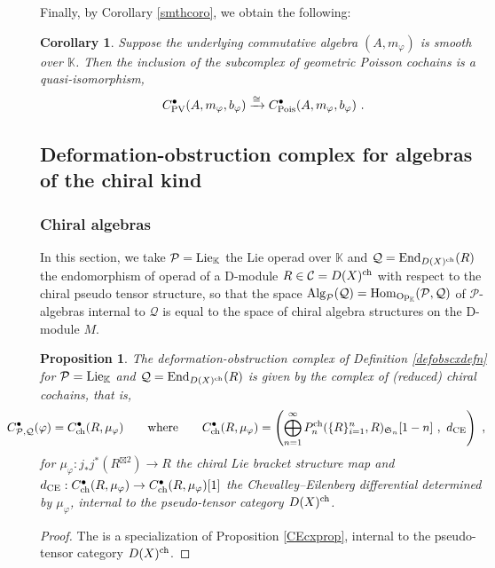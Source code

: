 \documentclass[11pt]{amsart}
\numberwithin{equation}{section}
\newtheorem{prop}[theo]{Proposition}
\newtheorem{coro}[theo]{Corollary}
\theoremstyle{definition}
\newcommand{\bb}{\mathbb}
\newcommand{\mc}{\mathcal}
\newcommand{\mf}{\mathfrak}
\DeclareMathOperator{\Hom}{Hom}
\newcommand{\K}{{\bb K}}
\newcommand{\End}{{\textup{End}}}
\newcommand{\Alg}{{\textup{Alg}}}
\newcommand{\Pois}{{\textup{Pois}}}
\newcommand{\Lie}{{\textup{Lie}}}
\newcommand{\ch}{{\textup{ch}}}
\newcommand{\Op}{{\textup{Op}}}
\newcommand{\Ss}{{{\mf{S}}}}
\newcommand{\PV}{{{\textup{PV}}}}
\newcommand{\0}{{\textbf{0}}}
\newcommand{\DD}{{D}}
\def\ch{{\rm ch}}
\def \mf{\mathfrak}
\def \Op{\mathrm{Op}}
\begin{document}
Finally, by Corollary \ref{smthcoro}, we obtain the following:

\begin{coro}\label{GOequivcoro} Suppose the underlying commutative algebra $(A,m_\varphi)$ is smooth over $\K$. Then the inclusion of the subcomplex of geometric Poisson cochains is a quasi-isomorphism,
\[C^\bullet_\PV(A,m_\varphi,b_\varphi) \xrightarrow{\cong} C_\Pois^\bullet(A,m_\varphi,b_\varphi) \ .\]
\end{coro}









\subsection{Deformation-obstruction complex for algebras of the chiral kind}\label{ssec:def chiral algebras}
\subsubsection{Chiral algebras} In this section, we take $\mc P=\Lie_\K$ the Lie operad over $\K$ and $\mc Q=\End_{\DD(X)^\ch}(R)$ the endomorphism of operad of a D-module $R\in \mc C = \DD(X)^\ch$ with respect to the chiral pseudo tensor structure, so that the space $\Alg_{\mc P}(\mc Q)=\Hom_{\Op_\K}(\mc P,\mc Q)$ of $\mc P$-algebras internal to $\mc Q$ is equal to the space of chiral algebra structures on the D-module $M$.



\begin{prop}\label{chHoccxprop}
	The deformation-obstruction complex of Definition \ref{defobscxdefn} for $\mc P=\Lie_\K$ and $\mc Q=\End_{\DD(X)^\ch}(R)$ is given by the complex of (reduced) chiral cochains, that is,
	\[ \hspace*{-1cm} C^\bullet_{\mc P,\mc Q}(\varphi) = C^\bullet_{\ch}(R,\mu_\varphi) \qquad \text{where}\qquad C^\bullet_{\ch}(R,\mu_\varphi) = \left( \bigoplus_{n=1}^\infty  P_n^\ch(\{R\}_{i=1}^n ,R)_{\Ss_n}[1-n] \ , \ d_\textup{CE} \right)  \ , \]
	for $\mu_\varphi:j_*j^{*}(R^{\boxtimes 2}) \to R$ the chiral Lie bracket structure map and $d_\text{CE}:C^\bullet_{\ch}(R,\mu_\varphi)\to C^\bullet_{\ch}(R,\mu_\varphi)[1]$ the Chevalley--Eilenberg differential determined by $\mu_\varphi$, internal to the pseudo-tensor category $\DD(X)^\ch$.
\end{prop}
\begin{proof} The is a specialization of Proposition \ref{CEcxprop}, internal to the pseudo-tensor category $\DD(X)^\ch$.
\end{proof}
\end{document}
